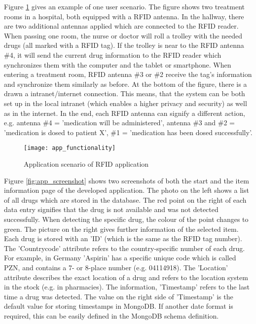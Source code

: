 Figure \ref{fig:appfunctionality} gives an example of one user scenario. The figure shows two treatment rooms in a hospital, both equipped with a RFID antenna. In the hallway, there are two additional antennas applied which are connected to the RFID reader. When passing one room, the nurse or doctor will roll a trolley with the needed drugs (all marked with a RFID tag). If the trolley is near to the RFID antenna \#4, it will send the current drug information to the RFID reader which synchronizes them with the computer and the tablet or smartphone. When entering a treatment room, RFID antenna \#3 or \#2 receive the tag's information and synchronize them similarly as before. At the bottom of the figure, there is a drawn a intranet/internet connection. This means, that the system can be both set up in the local intranet (which enables a higher privacy and security) as well as in the internet. In the end, each RFID antenna can signify a different action, e.g. antenna \#4 = 'medication will be administered', antenna \#3 and \#2 = 'medication is dosed to patient X', \#1 = 'medication has been dosed successfully'.

\begin{figure}
\centering
\texttt{[image: app\_functionality]} 
\caption{\label{fig:appfunctionality}Application scenario of RFID application} 
\end{figure}

Figure \ref{fig:app_screenshot} shows two screenshots of both the start and the item information page of the developed application. The photo on the left shows a list of all drugs which are stored in the database. The red point on the right of each data entry signifies that the drug is not available and was not detected successfully. When detecting the specific drug, the colour of the point changes to green.
The picture on the right gives further information of the selected item. Each drug is stored with an 'ID' (which is the same as the RFID tag number). The 'Countrycode' attribute refers to the country-specific number of each drug. For example, in Germany 'Aspirin' has a specific unique code which is called \ac{PZN}, and contains a 7- or 8-place number (e.g. 04114918). The 'Location' attribute describes the exact location of a drug and refers to the location system in the stock (e.g. in pharmacies). The information, 'Timestamp' refers to the last time a drug was detected. The value on the right side of 'Timestamp' is the default value for storing timestamps in MongoDB. If another date format is required, this can be easily defined in the MongoDB schema definition.

